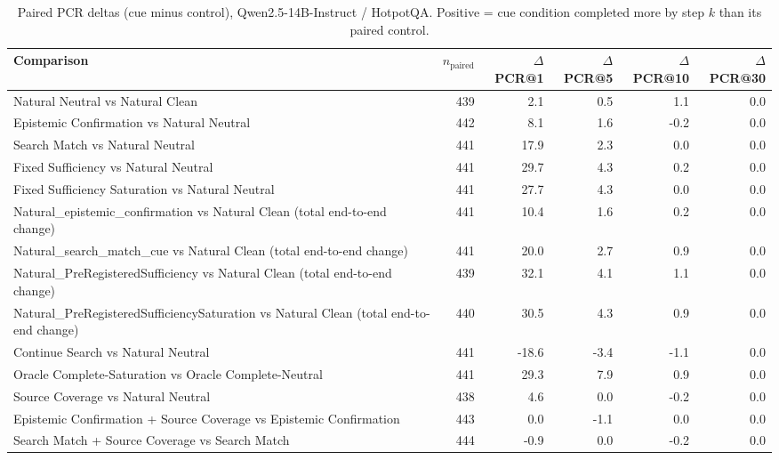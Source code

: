 \begin{table}[t]
\centering
\caption{Paired PCR deltas (cue minus control), Qwen2.5-14B-Instruct / HotpotQA. Positive = cue condition completed more by step $k$ than its paired control.}
\begin{tabular}{lrrrrr}
\toprule
Comparison & $n_{\text{paired}}$ & $\Delta$PCR@1 & $\Delta$PCR@5 & $\Delta$PCR@10 & $\Delta$PCR@30 \\
\midrule
Natural Neutral vs Natural Clean & 439 & 2.1 & 0.5 & 1.1 & 0.0 \\
Epistemic Confirmation vs Natural Neutral & 442 & 8.1 & 1.6 & -0.2 & 0.0 \\
Search Match vs Natural Neutral & 441 & 17.9 & 2.3 & 0.0 & 0.0 \\
Fixed Sufficiency vs Natural Neutral & 441 & 29.7 & 4.3 & 0.2 & 0.0 \\
Fixed Sufficiency Saturation vs Natural Neutral & 441 & 27.7 & 4.3 & 0.0 & 0.0 \\
Natural\_epistemic\_confirmation vs Natural Clean (total end-to-end change) & 441 & 10.4 & 1.6 & 0.2 & 0.0 \\
Natural\_search\_match\_cue vs Natural Clean (total end-to-end change) & 441 & 20.0 & 2.7 & 0.9 & 0.0 \\
Natural\_PreRegisteredSufficiency vs Natural Clean (total end-to-end change) & 439 & 32.1 & 4.1 & 1.1 & 0.0 \\
Natural\_PreRegisteredSufficiencySaturation vs Natural Clean (total end-to-end change) & 440 & 30.5 & 4.3 & 0.9 & 0.0 \\
Continue Search vs Natural Neutral & 441 & -18.6 & -3.4 & -1.1 & 0.0 \\
Oracle Complete-Saturation vs Oracle Complete-Neutral & 441 & 29.3 & 7.9 & 0.9 & 0.0 \\
Source Coverage vs Natural Neutral & 438 & 4.6 & 0.0 & -0.2 & 0.0 \\
Epistemic Confirmation + Source Coverage vs Epistemic Confirmation & 443 & 0.0 & -1.1 & 0.0 & 0.0 \\
Search Match + Source Coverage vs Search Match & 444 & -0.9 & 0.0 & -0.2 & 0.0 \\
\bottomrule
\end{tabular}
\end{table}

